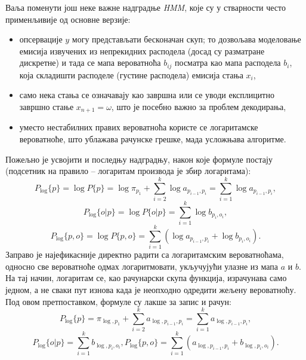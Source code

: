 \documentclass[12pt,oneside]{memoir}
\begin{document}
\begin{CJK}{UTF8}{ipxm}
Ваља поменути још неке важне надградње \textit{HMM}, које су у стварности често применљивије од основне верзије:
\begin{itemize}
  \item опсервације $y$ могу представљати бесконачан скуп; то дозвољава моделовање емисија извучених из непрекидних расподела (досад су разматране дискретне) и тада се мапа вероватноћа $b_{ij}$ посматра као мапа расподела $b_i$, која складишти расподеле (густине расподела) емисија стања $x_i$,
  \item само нека стања се означавају као завршна или се уводи експлицитно завршно стање $x_{n+1} = \omega$, што је посебно важно за проблем декодирања,
  \item уместо нестабилних правих вероватноћа користе се логаритамске вероватноће, што ублажава рачунске грешке, мада усложњава алгоритме.
\end{itemize}

Пожељно је усвојити и последњу надградњу, након које формуле постају (подсетник на правило -- логаритам производа је збир логаритама): $$P_{\log}\{p\} = \log P\{p\} = \log \pi_{p_1} + \sum_{i=2}^k \log a_{p_{i-1}, p_i} = \sum_{i=1}^k \log a_{p_{i-1}, p_i},$$ $$P_{\log}\{o | p\} = \log P\{o | p\} = \sum_{i=1}^k \log b_{p_i, o_i},$$ $$P_{\log}\{p, o\} = \log P\{p, o\} = \sum_{i=1}^k (\log a_{p_{i-1}, p_i} + \log b_{p_i, o_i}).$$ Заправо је најефикасније директно радити са логаритамским вероватноћама, односно све вероватноће одмах логаритмовати, укључујући улазне из мапа $a$ и $b$. На тај начин, логаритам се, као рачунарски скупа функција, израчунава само једном, а не сваки пут изнова када је неопходно одредити жељену вероватноћу. Под овом претпоставком, формуле су лакше за запис и рачун: $$P_{\log}\{p\} = \pi_{\log, p_1} + \sum_{i=2}^k a_{\log, p_{i-1}, p_i} = \sum_{i=1}^k a_{\log, p_{i-1}, p_i},$$ $$P_{\log}\{o | p\} = \sum_{i=1}^k b_{\log, p_i, o_i}, P_{\log}\{p, o\} = \sum_{i=1}^k (a_{\log, p_{i-1}, p_i} + b_{\log, p_i, o_i}).$$


\end{CJK}
\end{document}
